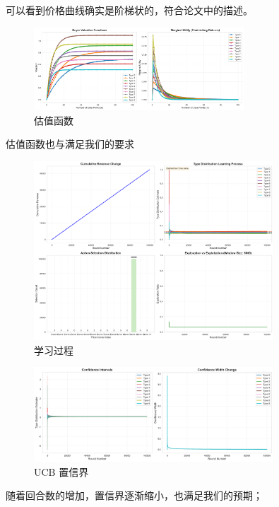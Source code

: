可以看到价格曲线确实是阶梯状的，符合论文中的描述。

\begin{figure}[H]
    \centering
    \includegraphics[width=0.7\textwidth]{figures/02_valuation_functions.png}
    \caption{估值函数}
\end{figure}

估值函数也与满足我们的要求

\begin{figure}[H]
    \centering
    \includegraphics[width=0.8\textwidth]{figures/04_learning_process.png}
    \caption{学习过程}
\end{figure}

\begin{figure}[H]
    \centering
    \includegraphics[width=0.8\textwidth]{figures/05_confidence_bounds.png}
    \caption{UCB 置信界}
\end{figure}

随着回合数的增加，置信界逐渐缩小，也满足我们的预期；








